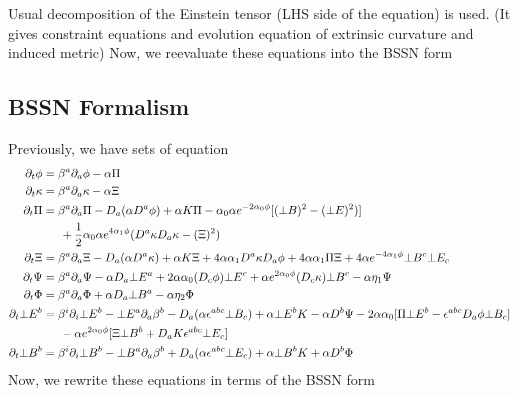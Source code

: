 \documentclass[prd]{revtex4}
\begin{document}
Usual decomposition of the Einstein tensor (LHS side of the equation) is used. (It gives constraint equations and evolution equation of extrinsic curvature and induced metric) Now, we reevaluate these equations into the BSSN form


\subsection{BSSN Formalism}
Previously, we have sets of equation 
\begin{align}
\partial_t \phi &= \beta^a \partial_a \phi - \alpha \Pi \nonumber \\
\partial_t \kappa &= \beta^a \partial_a \kappa - \alpha \Xi  \nonumber\\
\partial_t \Pi &= \beta^a \partial_a \Pi - D_a (\alpha D^a \phi) + \alpha K \Pi -\alpha_0 \alpha e^{-2 \alpha_0 \phi}  [ (\bot B)^2 - (\bot E)^2)]  \nonumber \\
		&\indent + \frac{1}{2} \alpha_0 \alpha e^{4 \alpha_1 \phi} (D^a \kappa D_a \kappa - (\Xi)^2)  \nonumber \\
\partial_t \Xi &= \beta^a \partial_a \Xi -  D_a (\alpha D^a \kappa) + \alpha K \Xi +4 \alpha \alpha_1 D^a \kappa D_a \phi + 4 \alpha \alpha_1 \Pi \Xi + 4 \alpha e^{-4 \alpha_1 \phi} \bot B^c \bot E_c \nonumber \\
\partial_t \Psi &= \beta^a \partial_a \Psi - \alpha D_a \bot E^a + 2 \alpha  \alpha_0 (D_c \phi) \bot E^c + \alpha  e^{2 \alpha_0 \phi} (D_c \kappa) \bot B^c  - \alpha \eta_1 \Psi \nonumber \\
\partial_t \Phi &=  \beta^a \partial_a \Phi +\alpha D_a \bot B^a  - \alpha  \eta_2 \Phi \nonumber \\
\partial_t \bot E^b &= \beta^i \partial_i \bot E^b -\bot E^a \partial_a \beta^b -D_a (\alpha \epsilon^{abc} \bot B_c ) + \alpha \bot E^b K - \alpha D^b \Psi - 2 \alpha \alpha_0 [ \Pi \bot E^b - \epsilon^{abc} D_a \phi \bot B_c ] \nonumber \\
				  &\indent - \alpha e^{2 \alpha_0 \phi} [ \Xi \bot B^b + D_a K \epsilon^{abc} \bot E_c] \\
\partial_t \bot B^b &= \beta^i \partial_i \bot B^b- \bot B^a \partial_a \beta^b + D_a (\alpha \epsilon^{abc} \bot E_c ) + \alpha \bot B^b K + \alpha D^b \Phi \nonumber
\end{align}
Now, we rewrite these equations in terms of the BSSN form
\end{document}
